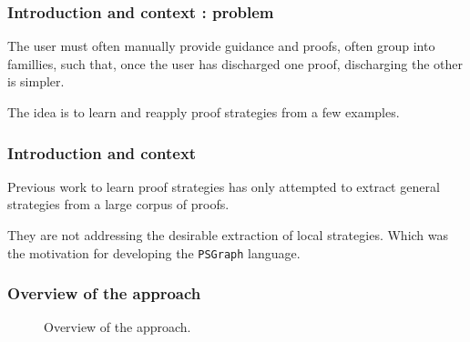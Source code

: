 \documentclass[11pt,handout]{beamer}
\begin{document}
\begin{frame}
  \frametitle{Introduction and context : problem}
  The user must often manually provide guidance and proofs, often group into
  famillies, such that, once the user has discharged one proof, discharging the
  other is simpler.

  \vspace*{1cm}

  The idea is to learn and reapply proof strategies from a few examples.
\end{frame}

\begin{frame}
  \frametitle{Introduction and context}
  Previous work to learn proof strategies has only attempted to extract general
  strategies from a large corpus of proofs.

  \vspace*{1cm}
  
  They are not addressing the desirable extraction of local strategies. Which
  was the motivation for developing the \texttt{PSGraph} language.
\end{frame}

\begin{frame}[fragile]
  \frametitle{Overview of the approach}
  \begin{figure}[h]
    \centering
    \caption{Overview of the approach.}
  \end{figure}
\end{frame}
\end{document}
